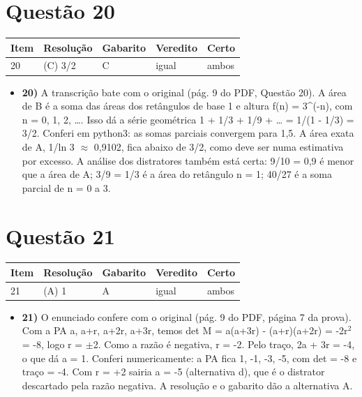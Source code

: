 \documentclass{article}%
\begin{document}
\section*{Questão 20}%
\begin{longtable}{@{}p{} p{} p{} p{} p{}@{}}\toprule Item & Resolução & Gabarito & Veredito & Certo \\ \midrule
20 & (C) 3/2 & C & igual & ambos \\
\bottomrule\end{longtable}%
\begin{itemize}%
\item%
\textbf{20)} A transcrição bate com o original (pág. 9 do PDF, Questão 20). A área de B é a soma das áreas dos retângulos de base 1 e altura f(n) = 3\^{}({-}n), com n = 0, 1, 2, \ldots{}. Isso dá a série geométrica 1 + 1/3 + 1/9 + \ldots{} = 1/(1 - 1/3) = 3/2. Conferi em python3: as somas parciais convergem para 1,5. A área exata de A, 1/ln 3 $\approx$ 0,9102, fica abaixo de 3/2, como deve ser numa estimativa por excesso. A análise dos distratores também está certa: 9/10 = 0,9 é menor que a área de A; 3/9 = 1/3 é a área do retângulo n = 1; 40/27 é a soma parcial de n = 0 a 3.%
\end{itemize}%
\section*{Questão 21}%
\begin{longtable}{@{}p{} p{} p{} p{} p{}@{}}\toprule Item & Resolução & Gabarito & Veredito & Certo \\ \midrule
21 & (A) 1 & A & igual & ambos \\
\bottomrule\end{longtable}%
\begin{itemize}%
\item%
\textbf{21)} O enunciado confere com o original (pág. 9 do PDF, página 7 da prova). Com a PA a, a+r, a+2r, a+3r, temos det M = a(a+3r) - (a+r)(a+2r) = -2r$^2$ = -8, logo r = $\pm$2. Como a razão é negativa, r = -2. Pelo traço, 2a + 3r = -4, o que dá a = 1. Conferi numericamente: a PA fica 1, -1, -3, -5, com det = -8 e traço = -4. Com r = +2 sairia a = -5 (alternativa d), que é o distrator descartado pela razão negativa. A resolução e o gabarito dão a alternativa A.%
\end{itemize}%
\end{document}
